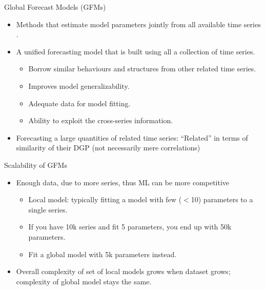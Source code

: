 \documentclass{beamer}
\begin{document}
   \begin{frame}{Global Forecast Models (GFMs)}
  	\begin{itemize}
  	\item Methods that estimate model parameters jointly from all available time series \cite{Januschowski2020-ud}.
	\vspace{2.0mm}
	\item A unified forecasting model that is built using all a collection of time series.
	\vspace{1.0mm}
	  \begin{itemize}\color{blue}
		\item Borrow similar behaviours and structures from other related time series.
		\item Improves model generalizability.
		\item Adequate data for model fitting.
		\item Ability to exploit the cross-series information.
	  \end{itemize}	   
	\vspace{2.0mm}	  
	  \item Forecasting a large quantities of related time series: ``Related'' in terms of similarity of their DGP (not
necessarily mere correlations)
 	\end{itemize}
   \end{frame} 
   
  
   \begin{frame}{Scalability of GFMs}
  	\begin{itemize}
  	\item Enough data, due to more series, thus ML can be more competitive~\cite{Bergmeir2020-nu}
	\vspace{2.0mm}
	  \begin{itemize}\color{blue}
		\item Local model: typically fitting a model with few ($<$10) parameters to a single series.
		\item If you have 10k series and fit 5 parameters, you end up with 50k parameters.
		\item Fit a global model with 5k parameters instead.
	  \end{itemize}	   
	\vspace{2.0mm}	  
	  \item Overall complexity of set of local models grows when dataset grows; complexity of global model stays the same.
 	\end{itemize}
   \end{frame}   
   
\end{document}
